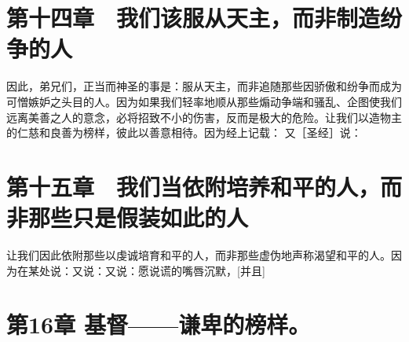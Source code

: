 
\section{第十四章　我们该服从天主，而非制造纷争的人}

因此，弟兄们，正当而神圣的事是：服从天主，而非追随那些因骄傲和纷争而成为可憎嫉妒之头目的人。因为如果我们轻率地顺从那些煽动争端和骚乱、企图使我们远离美善之人的意念，必将招致不小的伤害，反而是极大的危险。让我们以造物主的仁慈和良善为榜样，彼此以善意相待。因为经上记载： 又［圣经］说：\par


\section{第十五章　我们当依附培养和平的人，而非那些只是假装如此的人}

让我们因此依附那些以虔诚培育和平的人，而非那些虚伪地声称渴望和平的人。因为在某处说：又说：又说：愿说谎的嘴唇沉默，[并且]\par


\section{第16章 基督——谦卑的榜样。}

